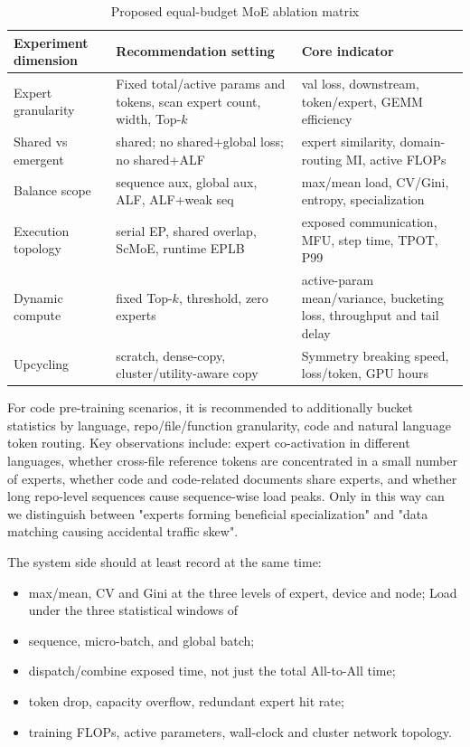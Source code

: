 \documentclass[10pt,a4paper,fontset=none]{ctexart}
\begin{document}
\begin{table}[htbp]
\centering
\caption{Proposed equal-budget MoE ablation matrix}
\label{en:tab:experiments}
\small
\begin{tabularx}{\textwidth}{p{}p{}Y}
\toprule
Experiment dimension & Recommendation setting & Core indicator \\
\midrule
Expert granularity & Fixed total/active params and tokens, scan expert count, width, Top-$k$ & val loss, downstream, token/expert, GEMM efficiency \\
Shared vs emergent & shared; no shared+global loss; no shared+ALF & expert similarity, domain-routing MI, active FLOPs \\
Balance scope & sequence aux, global aux, ALF, ALF+weak seq & max/mean load, CV/Gini, entropy, specialization \\
Execution topology & serial EP, shared overlap, ScMoE, runtime EPLB & exposed communication, MFU, step time, TPOT, P99 \\
Dynamic compute & fixed Top-$k$, threshold, zero experts & active-param mean/variance, bucketing loss, throughput and tail delay \\
Upcycling & scratch, dense-copy, cluster/utility-aware copy & Symmetry breaking speed, loss/token, GPU hours \\
\bottomrule
\end{tabularx}
\end{table}

For code pre-training scenarios, it is recommended to additionally bucket statistics by language, repo/file/function granularity, code and natural language token routing. Key observations include: expert co-activation in different languages, whether cross-file reference tokens are concentrated in a small number of experts, whether code and code-related documents share experts, and whether long repo-level sequences cause sequence-wise load peaks. Only in this way can we distinguish between "experts forming beneficial specialization" and "data matching causing accidental traffic skew".

The system side should at least record at the same time:
\begin{itemize}
\item max/mean, CV and Gini at the three levels of expert, device and node;
Load under the three statistical windows of \item sequence, micro-batch, and global batch;
\item dispatch/combine exposed time, not just the total All-to-All time;
  \item token drop, capacity overflow, redundant expert hit rate;
\item training FLOPs, active parameters, wall-clock and cluster network topology.
\end{itemize}
\end{document}

